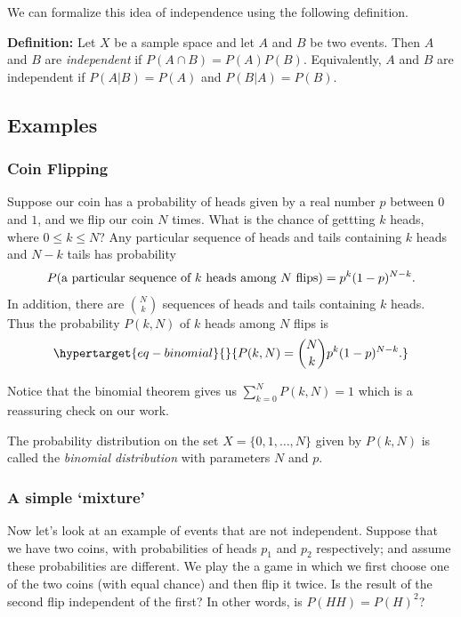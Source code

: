 \documentclass[
  11pt,
  letterpaper,
]{scrbook}
\theoremstyle{plain}
\theoremstyle{remark}
\begin{document}
We can formalize this idea of independence using the following
definition.

\textbf{Definition:} Let \(X\) be a sample space and let \(A\) and \(B\)
be two events. Then \(A\) and \(B\) are \emph{independent} if
\(P(A\cap B)=P(A)P(B)\). Equivalently, \(A\) and \(B\) are independent
if \(P(A|B)=P(A)\) and \(P(B|A)=P(B)\).

\hypertarget{examples}{%
\subsection{Examples}\label{examples}}

\hypertarget{coin-flipping}{%
\subsubsection{Coin Flipping}\label{coin-flipping}}

Suppose our coin has a probability of heads given by a real number \(p\)
between \(0\) and \(1\), and we flip our coin \(N\) times. What is the
chance of gettting \(k\) heads, where \(0\le k\le N\)? Any particular
sequence of heads and tails containing \(k\) heads and \(N-k\) tails has
probability \[
P(\hbox{a particular sequence of $k$ heads among $N$ flips}) = p^{k}(1-p)^{N-k}.
\] In addition, there are \(\binom{N}{k}\) sequences of heads and tails
containing \(k\) heads. Thus the probability \(P(k,N)\) of \(k\) heads
among \(N\) flips is
\begin{equation}\protect\hypertarget{eq-binomial}{}{
P(k,N) = \binom{N}{k}p^{k}(1-p)^{N-k}.
}\label{eq-binomial}\end{equation}

Notice that the binomial theorem gives us \(\sum_{k=0}^{N} P(k,N) =1\)
which is a reassuring check on our work.

The probability distribution on the set \(X=\{0,1,\ldots,N\}\) given by
\(P(k,N)\) is called the \emph{binomial distribution} with parameters
\(N\) and \(p\).

\hypertarget{a-simple-mixture}{%
\subsubsection{A simple `mixture'}\label{a-simple-mixture}}

Now let's look at an example of events that are not independent. Suppose
that we have two coins, with probabilities of heads \(p_1\) and \(p_2\)
respectively; and assume these probabilities are different. We play the
a game in which we first choose one of the two coins (with equal chance)
and then flip it twice. Is the result of the second flip independent of
the first? In other words, is \(P(HH)=P(H)^2\)?
\end{document}
